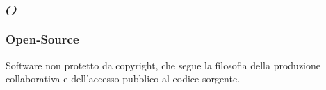 \subsection*{\quad$O\quad$}
\subsubsection*{Open-Source}
Software non protetto da copyright, che segue la filosofia della produzione collaborativa e dell'accesso pubblico al codice sorgente.

